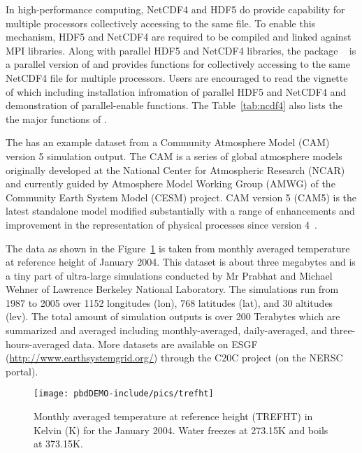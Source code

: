 In high-performance computing, NetCDF4 and HDF5 do provide capability for
multiple processors collectively accessing to the same file. To enable this
mechanism, HDF5 and NetCDF4 are required to be compiled and linked against
MPI libraries. Along with parallel HDF5 and NetCDF4 libraries,
the  package
~\citep{Patel2013pbdNCDF4package} is a parallel version of
 and provides functions for collectively accessing to the same
NetCDF4 file for multiple processors. Users are encouraged to read the
vignette~\citep{Patel2013pbdNCDF4vignette} of  which
including installation infromation of parallel HDF5 and NetCDF4 and
demonstration of parallel-enable functions.
The Table~\ref{tab:ncdf4} also lists the the major functions of
.

The  has an example dataset  from a
Community Atmosphere Model (CAM) version 5 simulation output.
The CAM is a series of
global atmosphere models originally developed at the National Center
for Atmospheric Research (NCAR) and currently guided by Atmosphere
Model Working Group (AMWG) of the Community Earth System Model (CESM)
project. CAM version 5 (CAM5) is the latest standalone model modified
substantially with a range of enhancements and improvement in the
representation of physical processes since version
4~\citep{CAM5,CESM1}.

The data  as shown in the Figure~\ref{fig:trefht}
is taken from monthly averaged temperature at
reference height of January 2004.
This dataset is about three megabytes and is a tiny part of
ultra-large simulations conducted by Mr Prabhat and Michael Wehner
of Lawrence Berkeley National Laboratory.
The simulations run from 1987 to 2005 over
1152 longitudes (lon), 768 latitudes (lat), and 30 altitudes (lev).
The total amount of simulation outputs is over 200 Terabytes
which are summarized and averaged including monthly-averaged,
daily-averaged, and three-hours-averaged data.
More datasets are available on ESGF (\url{http://www.earthsystemgrid.org/})
through the C20C project (on the NERSC portal).
\begin{figure}[t]
  \centering
  \texttt{[image: pbdDEMO-include/pics/trefht]}
  \caption[Monthly averaged temperature]{Monthly averaged temperature at reference height (TREFHT) in
           Kelvin (K) for the January 2004. Water freezes at 273.15K and
           boils at 373.15K.}
  \label{fig:trefht}
\end{figure}

